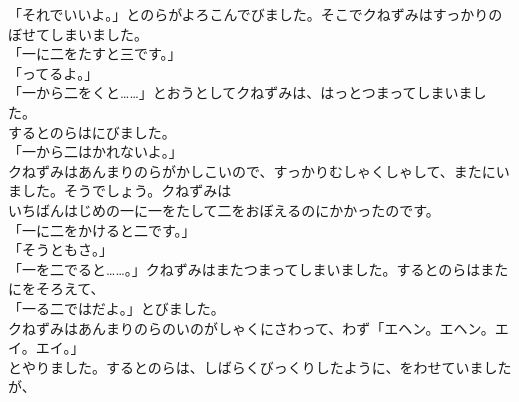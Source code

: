 \documentclass[
    a4paper,
    10pt,
    book]
    {tarticle}
\begin{document}
「それでいいよ。」とのらがよろこんでびました。そこでクねずみはすっかりのぼせてしまいました。\\
「一に二をたすと三です。」\\
「ってるよ。」\\
「一から二をくと……」とおうとしてクねずみは、はっとつまってしまいました。\\
\indent するとのらはにびました。\\
「一から二はかれないよ。」\\
\indent クねずみはあんまりのらがかしこいので、すっかりむしゃくしゃして、またにいました。そうでしょう。クねずみは\\
いちばんはじめの一に一をたして二をおぼえるのにかかったのです。\\
「一に二をかけると二です。」\\
「そうともさ。」\\
「一を二でると……。」クねずみはまたつまってしまいました。するとのらはまたにをそろえて、\\
「一る二ではだよ。」とびました。\\
\indent クねずみはあんまりのらのいのがしゃくにさわって、わず「エヘン。エヘン。エイ。エイ。」\\
とやりました。するとのらは、しばらくびっくりしたように、をわせていましたが、
\newpage
\thispagestyle{fancy}
\end{document}
